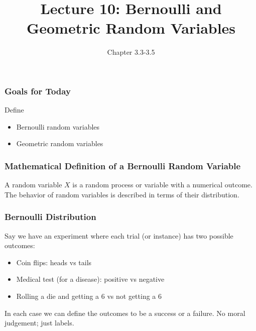 \documentclass[slides]{beamer}
\title{Lecture 10: Bernoulli and Geometric Random Variables}
\author{Chapter 3.3-3.5}
\date{}
\newcommand{\blue}[1]{\textcolor{blue2}{#1}}
\begin{document}
\begin{frame}
\titlepage
\end{frame}



\begin{frame}[fragile]
\frametitle{Goals for Today}

Define
\begin{itemize}
\item Bernoulli random variables
\item Geometric random variables
\end{itemize}


\end{frame}


\begin{frame}[fragile]
\frametitle{Mathematical Definition of a Bernoulli Random Variable}

A \blue{random variable $X$} is a random process or variable with a numerical outcome.  The behavior of 
random variables is described in terms of their \blue{distribution}.

\end{frame}


\begin{frame}
\frametitle{Bernoulli Distribution}

Say we have an experiment where each \blue{trial} (or instance) has two possible outcomes:
\pause\begin{itemize}
\item Coin flips:  heads vs tails
\item Medical test (for a disease):  positive vs negative
\item Rolling a die and getting a 6 vs not getting a 6
\end{itemize}

\vspace{0.5cm}

\pause In each case we can \blue{define} the outcomes to be a \blue{success} or a \blue{failure}.  No moral judgement; just labels.

\end{frame}
\end{document}
